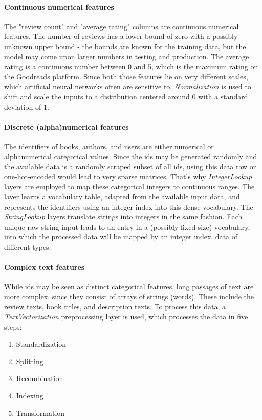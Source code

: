 \documentclass[10pt,final,journal,a4paper,oneside,twocolumn]{IEEEtran}
\begin{document}

\paragraph{Continuous numerical features}
The "review count" and "average rating" columns are continuous numerical features. The number of reviews has a lower bound of zero with a possibly unknown upper bound - the bounds are known for the training data, but the model may come upon larger numbers in testing and production. The average rating is a continuous number between 0 and 5, which is the maximum rating on the Goodreads platform. Since both those features lie on very different scales, which artificial neural networks often are sensitive to, \emph{Normalization} is used to shift and scale the inputs to a distribution centered around 0 with a standard deviation of 1.

\paragraph{Discrete (alpha)numerical features}
The identifiers of books, authors, and users are either numerical or alphanumerical categorical values. Since the ids may be generated randomly and the available data is a randomly scraped subset of all ids, using this data raw or one-hot-encoded would lead to very sparse matrices.
That's why \emph{IntegerLookup} layers are employed to map these categorical integers to continuous ranges. The layer learns a vocabulary table, adapted from the available input data, and represents the identifiers using an integer index into this dense vocabulary. 
The \emph{StringLookup} layers translate strings into integers in the same fashion. Each unique raw string input leads to an entry in a (possibly fixed size) vocabulary, into which the processed data will be mapped by an integer index.
data of different types:

\paragraph{Complex text features}
While ids may be seen as distinct categorical features, long passages of text are more complex, since they consist of arrays of strings (words). These include the review texts, book titles, and description texts. To process this data, a \emph{TextVectorization} preprocessing layer is used, which processes the data in five steps:
\begin{enumerate}
    \item Standardization
    \item Splitting
    \item Recombination
    \item Indexing
    \item Transformation
\end{enumerate}
\end{document}
